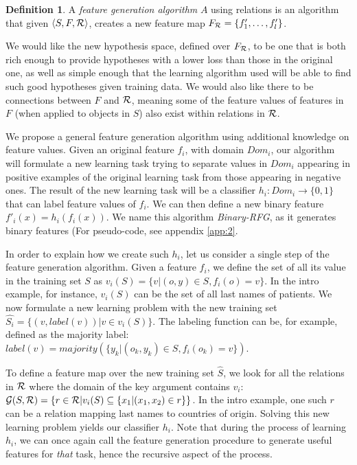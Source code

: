\documentclass[12pt, a4paper]{article}
\theoremstyle{definition}
\newtheorem{defn}{Definition}[section]
\begin{document}
\begin{defn}
A \emph{feature generation algorithm} $A$ using relations is an algorithm that given $\langle S,F,{\cal R} \rangle$, creates a new feature map $F_{\cal R}=\{f'_{1},\ldots,f'_{l}\}$.
\end{defn}

We would like the new hypothesis space, defined over $F_{\cal R}$, to be one that is both rich enough to provide hypotheses with a lower loss than those in the original one, as well as simple enough that the learning algorithm used will be able to find such good hypotheses given training data.
We would also like there to be connections between $F$ and ${\cal R}$, meaning some of the feature values of features in $F$ (when applied to objects in $S$) also exist within relations in $\cal R$.

We propose a general feature generation algorithm using additional knowledge on feature values.
Given an original feature $f_{i}$, with domain $Dom_i$, our algorithm will formulate a new learning task trying to separate values in $Dom_i$ appearing in positive examples of the original learning task from those appearing in negative ones.  The result of the new learning task will be a classifier
$h_{i}:Dom_{i}\rightarrow \{0,1\}$ that can label feature values of $f_{i}$. We can then define a new binary feature $f'_{i}(x)=h_{i}(f_{i}(x))$. 
We name this algorithm \emph{Binary-RFG}, as it generates binary features (For pseudo-code, see appendix \ref{app:2}.

In order to explain how we create such $h_{i}$, let us consider a single step of the feature generation algorithm.
Given a feature $f_{i}$, we define the set of all its value in the training set $S$ as $v_i(S) = \{v | (o,y) \in S, f_{i}(o)=v\}$. In the intro example, for instance, $v_i(S)$ can be the set of all last names of patients.
We now formulate a new learning problem with the new training set
$\hat{S_i} = \{ (v, label(v)) | v \in v_i(S) \}$.
The labeling function can be, for example, defined as
the majority label: $label(v)=majority(\{y_k| \left(o_k,y_k \right) \in S, f_{i}(o_k)=v\})$.

To define a feature map over the new training set $\hat{S}$, we look for all the relations in $\cal R$ where the domain of the key argument contains $v_i$:
${\cal G}(S,{\cal R}) = \left\{ r \in {\cal R} | v_i(S) \subseteq \{x_1 | (x_1,x_2) \in r\}\right\}$.  In the intro example, one such $r$ can be a relation mapping last names to countries of origin.
Solving this new learning problem yields our classifier $h_{i}$.
Note that during the process of learning $h_{i}$, we can once again call the feature generation procedure to generate useful features for \emph{that} task, hence the recursive aspect of the process.
\end{document}
